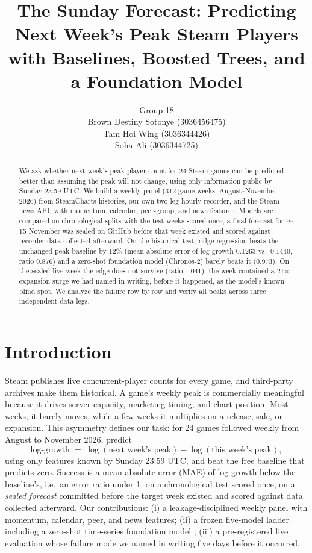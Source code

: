 \documentclass[10pt,letterpaper]{article}
\title{The Sunday Forecast: Predicting Next Week's Peak Steam Players\\with Baselines, Boosted Trees, and a Foundation Model}
\author{Group 18\\
{}Brown Destiny Sotonye (3036456475)\\
{}Tam Hoi Wing (3036344426)\\
{}Soha Ali (3036344725)}
\begin{document}
\maketitle

\begin{abstract}
We ask whether next week's peak player count for 24 Steam games can be predicted better than assuming the peak will not change, using only information public by Sunday 23:59 UTC. We build a weekly panel (312 game-weeks, August--November 2026) from SteamCharts histories, our own two-leg hourly recorder, and the Steam news API, with momentum, calendar, peer-group, and news features. Models are compared on chronological splits with the test weeks scored once; a final forecast for 9--15 November was sealed on GitHub before that week existed and scored against recorder data collected afterward. On the historical test, ridge regression beats the unchanged-peak baseline by 12\% (mean absolute error of log-growth 0.1263 vs.\ 0.1440, ratio 0.876) and a zero-shot foundation model (Chronos-2) barely beats it (0.973). On the sealed live week the edge does not survive (ratio 1.041): the week contained a 21$\times$ expansion surge we had named in writing, before it happened, as the model's known blind spot. We analyze the failure row by row and verify all peaks across three independent data legs.
\end{abstract}

\section{Introduction}
Steam publishes live concurrent-player counts for every game, and third-party archives make them historical. A game's weekly peak is commercially meaningful because it drives server capacity, marketing timing, and chart position. Most weeks, it barely moves, while a few weeks it multiplies on a release, sale, or expansion. This asymmetry defines our task: for 24 games followed weekly from August to November 2026, predict
\[
\text{log-growth} \;=\; \log(\text{next week's peak}) - \log(\text{this week's peak}),
\]
using only features known by Sunday 23:59 UTC, and beat the free baseline that predicts zero. Success is a mean absolute error (MAE) of log-growth below the baseline's, i.e.\ an error ratio under 1, on a chronological test scored once, on a \emph{sealed forecast} committed before the target week existed and scored against data collected afterward. Our contributions: (i) a leakage-disciplined weekly panel with momentum, calendar, peer, and news features; (ii) a frozen five-model ladder including a zero-shot time-series foundation model \citep{ansari2024chronos}; (iii) a pre-registered live evaluation whose failure mode we named in writing five days before it occurred.
\end{document}
